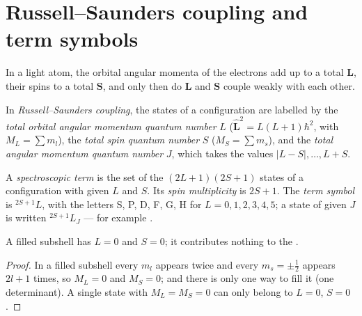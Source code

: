 \section{Russell--Saunders coupling and term symbols}

In a light atom, the orbital angular momenta of the electrons add up to a
total $\mathbf L$, their spins to a total $\mathbf S$, and only then do
$\mathbf L$ and $\mathbf S$ couple weakly with each other.

\begin{definition}\label{def:b3:many-electron-atoms:russell-saunders}
In \emph{Russell--Saunders coupling}, the
states of a configuration are labelled by the \emph{total orbital angular
momentum quantum number}
$L$ ($\hat{\mathbf L}^2 = L(L+1)\hbar^2$, with $M_L = \sum m_l$), the \emph{total
spin quantum number} $S$ ($M_S = \sum m_s$),
and the \emph{total angular momentum quantum number}
$J$, which takes the values $|L - S|, \dots, L + S$.
\end{definition}

\begin{definition}\label{def:b3:many-electron-atoms:term}
A \emph{spectroscopic term} is the set of the
$(2L+1)(2S+1)$ states of a configuration with given $L$ and $S$. Its
\emph{spin multiplicity} is $2S + 1$. The \emph{term symbol}
 is ${}^{2S+1}L$, with the letters S, P, D, F, G, H
for $L = 0, 1, 2, 3, 4, 5$; a state of given $J$ is written ${}^{2S+1}L_J$ ---
for example .
\end{definition}

\begin{proposition}\label{prop:b3:many-electron-atoms:closed-shell}
A filled subshell has $L = 0$ and $S = 0$; it contributes nothing to the
.
\end{proposition}

\begin{proof}
In a filled subshell every $m_l$ appears twice and every $m_s = \pm\frac12$
appears $2l+1$ times, so $M_L = 0$ and $M_S = 0$; and there is only one way to
fill it (one determinant). A single state with $M_L = M_S = 0$ can only
belong to $L = 0$, $S = 0$.
\end{proof}

